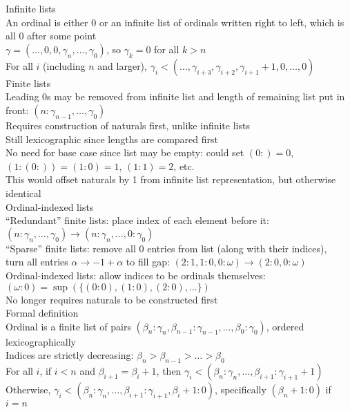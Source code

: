 \documentclass{article}
\newcommand{\w}{\omega}
\begin{document}
\newcommand{\hopen}[1]{[#1)}
  \newcommand{\indentsarewack}{]}

Infinite lists \\
An ordinal is either 0 or an infinite list of ordinals written right to left,
which is all 0 after some point \\
$\gamma = (\ldots, 0, 0, \gamma_n, \ldots, \gamma_0)$,
so $\gamma_k = 0$ for all $k > n$ \\
For all $i$ (including $n$ and larger),
$\gamma_i < (\ldots, \gamma_{i+3}, \gamma_{i+2}, \gamma_{i+1}+1, 0, \ldots, 0)$ \\

Finite lists \\
Leading 0s may be removed from infinite list and length of remaining list put in front:
$(n: \gamma_{n-1}, \ldots, \gamma_0)$ \\
Requires construction of naturals first, unlike infinite lists \\
Still lexicographic since lengths are compared first \\
No need for base case since list may be empty:
could set $(0:)=0$, $(1: (0:))=(1: 0)=1$, $(1: 1)=2$, etc. \\
This would offset naturals by 1 from infinite list representation,
but otherwise identical \\

Ordinal-indexed lists \\
``Redundant'' finite lists: place index of each element before it:
$(n: \gamma_n, \ldots, \gamma_0) \rightarrow (n: \gamma_n, \ldots, 0: \gamma_0)$ \\
``Sparse'' finite lists: remove all 0 entries from list (along with their indices), \\
turn all entries $\alpha \rightarrow -1+\alpha$ to fill gap:
$(2: 1, 1: 0, 0: \w) \rightarrow (2: 0, 0: \w)$ \\
Ordinal-indexed lists: allow indices to be ordinals themselves:
$(\omega: 0) = \sup(\{(0: 0), (1: 0), (2: 0), \ldots\})$ \\
No longer requires naturals to be constructed first \\

Formal definition \\
Ordinal is a finite list of pairs
$(\beta_n: \gamma_n, \beta_{n-1}: \gamma_{n-1}, \ldots, \beta_0: \gamma_0)$,
ordered lexicographically \\
Indices are strictly decreasing: $\beta_n > \beta_{n-1} > \ldots > \beta_0$ \\
For all $i$, if $i < n$ and $\beta_{i+1}=\beta_i+1$, then
$\gamma_i < (\beta_n: \gamma_n, \ldots, \beta_{i+1}: \gamma_{i+1}+1)$ \\
Otherwise, $\gamma_i < (\beta_n: \gamma_n, \ldots, \beta_{i+1}: \gamma_{i+1}, \beta_i+1: 0)$, specifically $(\beta_n+1: 0)$ if $i=n$ \\
\end{document}
